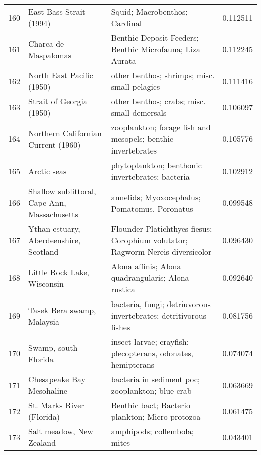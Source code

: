 \begin{tabular}{rllr}
160 & East Bass Strait (1994) & Squid; Macrobenthos; Cardinal & 0.112511 \\
161 & Charca de Maspalomas & Benthic Deposit Feeders; Benthic Microfauna; Liza Aurata & 0.112245 \\
162 & North East Pacific (1950) & other benthos; shrimps; misc. small pelagics & 0.111416 \\
163 & Strait of Georgia (1950) & other benthos; crabs; misc. small demersals & 0.106097 \\
164 & Northern Californian Current (1960) & zooplankton; forage fish and mesopels; benthic invertebrates & 0.105776 \\
165 & Arctic seas & phytoplankton; benthonic invertebrates; bacteria & 0.102912 \\
166 & Shallow sublittoral, Cape Ann, Massachusetts & annelids; Myoxocephalus; Pomatomus, Poronatus & 0.099548 \\
167 & Ythan estuary, Aberdeenshire, Scotland & Flounder Platichthyes fiesus; Corophium volutator; Ragworm Nereis diversicolor & 0.096430 \\
168 & Little Rock Lake, Wisconsin & Alona affinis; Alona quadrangularis; Alona rustica & 0.092640 \\
169 & Tasek Bera swamp, Malaysia & bacteria, fungi; detriuvorous invertebrates; detritivorous fishes & 0.081756 \\
170 & Swamp, south Florida & insect larvae; crayfish; plecopterans, odonates, hemipterans & 0.074074 \\
171 & Chesapeake Bay Mesohaline & bacteria in sediment poc; zooplankton; blue crab & 0.063669 \\
172 & St. Marks River (Florida) & Benthic bact; Bacterio plankton; Micro protozoa & 0.061475 \\
173 & Salt meadow, New Zealand & amphipods; collembola; mites & 0.043401 \\
\bottomrule
\end{tabular}

